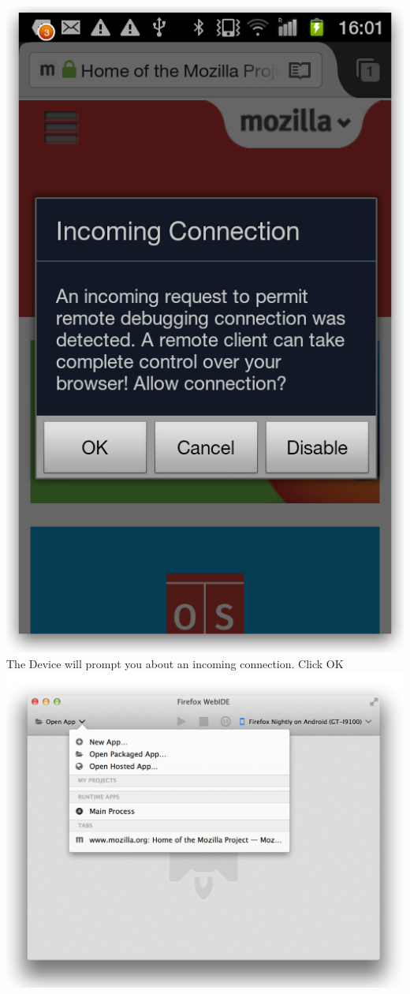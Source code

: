 \documentclass[12pt]{article}
\begin{document}
\begin{enumerate}
\begin{center}
\includegraphics[scale=0.25]{incoming-warning} \\
The Device will prompt you about an incoming connection. Click OK \\
\includegraphics[scale=0.4]{remote-debugging-android-open-tabs} \\

\end{center}
\end{enumerate}
\end{document}
